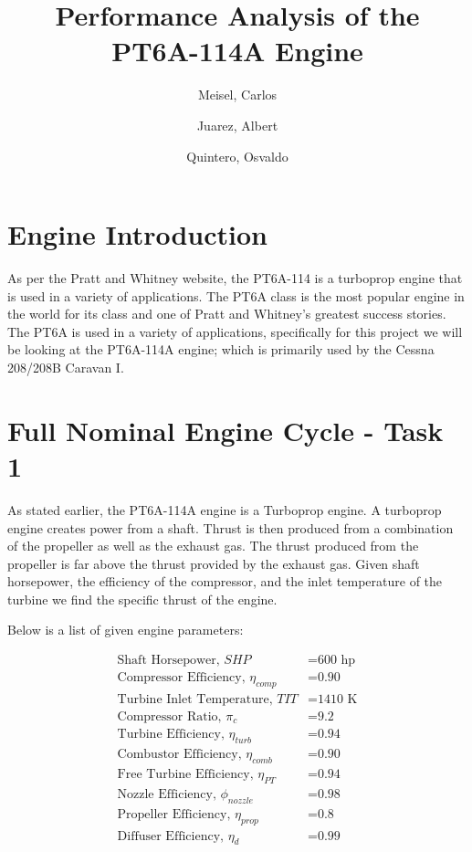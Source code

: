 \documentclass[titlepage]{article}
\author{
    Meisel, Carlos \\
  \and
  Juarez, Albert\\
  \and
    Quintero, Osvaldo\\
}
\title{Performance Analysis of the PT6A-114A Engine}
\begin{document}
  \maketitle

  \tableofcontents

    \section{Engine Introduction}

    As per the Pratt and Whitney website, the PT6A-114 is a turboprop engine that is used in a variety of applications. 
    The PT6A class is the most popular engine in the world for its class and one of Pratt and Whitney's greatest success stories.
    The PT6A is used in a variety of applications, specifically for this project we will be looking at the PT6A-114A engine; which is 
    primarily used by the Cessna 208/208B Caravan I. 

    \section{Full Nominal Engine Cycle - Task 1}

    As stated earlier, the PT6A-114A engine is a Turboprop engine.
    A turboprop engine creates power from a shaft. Thrust is then produced from a combination of the propeller as well as the exhaust gas. The thrust produced from the propeller is far above the thrust provided by the exhaust gas. Given shaft horsepower, the efficiency of the compressor, and the inlet temperature of the turbine we find the specific thrust of the engine.

    Below is a list of given engine parameters:

    \begin{equation}
        \begin{aligned}
            \text{Shaft Horsepower, $SHP$} &= \text{600 hp} \\
            \text{Compressor Efficiency, $\eta_{comp}$} &= \text{0.90} \\
            \text{Turbine Inlet Temperature, $TIT$} &= \text{1410 K} \\
            \text{Compressor Ratio, $\pi_{c}$} &= \text{9.2} \\
            \text{Turbine Efficiency, $\eta_{turb}$} &= \text{0.94} \\
            \text{Combustor Efficiency, $\eta_{comb}$} &= \text{0.90} \\
            \text{Free Turbine Efficiency, $\eta_{PT}$} &= \text{0.94} \\
            \text{Nozzle Efficiency, $\phi_{nozzle}$} &= \text{0.98} \\
            \text{Propeller Efficiency, $\eta_{prop}$} &= \text{0.8} \\
            \text{Diffuser Efficiency, $\eta_{d}$} &= \text{0.99} \\
        \end{aligned}
    \end{equation}
\end{document}
